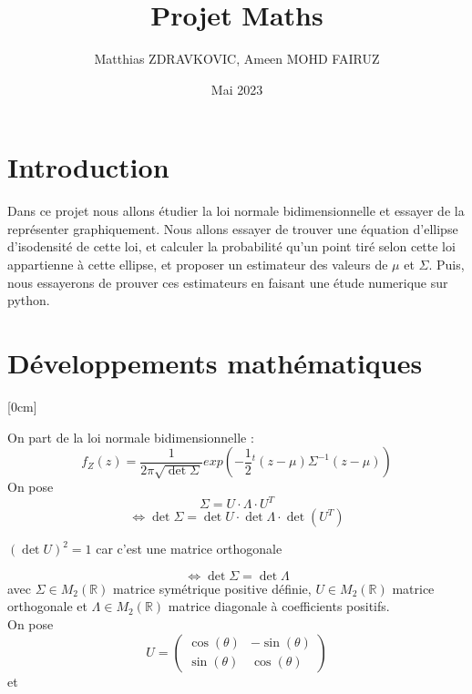 \documentclass{article}
\title{Projet Maths}
\author{Matthias ZDRAVKOVIC, Ameen MOHD FAIRUZ}
\date{Mai 2023}
\begin{document}
\maketitle

\section{Introduction}

Dans ce projet nous allons étudier la loi normale bidimensionnelle et essayer de la représenter graphiquement.
Nous allons essayer de trouver une équation d'ellipse d'isodensité de cette loi, et calculer la probabilité qu'un point tiré selon cette loi appartienne à cette ellipse, et proposer 
un estimateur des valeurs de $\mu$ et $\Sigma$. Puis, nous essayerons de prouver ces estimateurs en faisant une étude numerique sur python.

\section{Développements mathématiques}

\reversemarginpar{}[0cm]

On part de la loi normale bidimensionnelle :
$$f_Z(z) = \frac{1}{2\pi \sqrt{\det \Sigma}}exp(-\frac{1}{2}{}^{t}(z-\mu)\Sigma^{-1}(z-\mu))$$
On pose
$$\Sigma = U \cdot \Lambda \cdot U^T$$
$$ \Leftrightarrow \det \Sigma = \det U \cdot \det \Lambda \cdot \det (U^T) $$
\begin{center}
$(\det U)^{2}=1$ car c'est une matrice orthogonale
\end{center}
$$\Leftrightarrow \det \Sigma =\det \Lambda$$
avec $\Sigma \in M_2(\mathbb{R})$ matrice symétrique positive définie, $U \in M_2(\mathbb{R})$ matrice orthogonale et $\Lambda \in M_2(\mathbb{R})$ matrice diagonale à coefficients positifs.\\
On pose
\[
U = \begin{pmatrix}
    \cos(\theta) & -\sin(\theta) \\
    \sin(\theta) & \cos(\theta)
\end{pmatrix}
\]
et 
\end{document}
